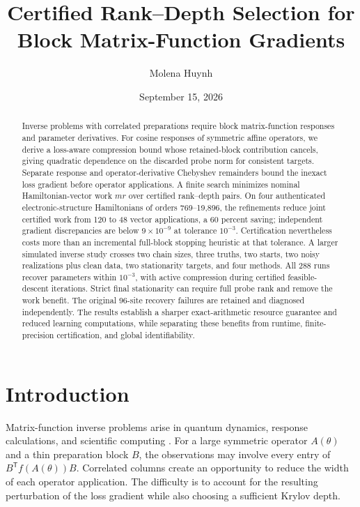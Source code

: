 \documentclass[10pt,letterpaper,twoside]{article}
\begin{document}
\title{Certified Rank--Depth Selection for Block Matrix-Function Gradients}
\author{Molena Huynh}
\date{September 15, 2026}
\maketitle
\begin{abstract}
Inverse problems with correlated preparations require block matrix-function
responses and parameter derivatives. For cosine responses of symmetric affine
operators, we derive a loss-aware compression bound whose retained-block
contribution cancels, giving quadratic dependence on the discarded probe norm
for consistent targets. Separate response and operator-derivative Chebyshev
remainders bound the inexact loss gradient before operator applications. A
finite search minimizes nominal Hamiltonian-vector work $mr$ over certified
rank--depth pairs. On four authenticated electronic-structure Hamiltonians of
orders 769--19,896, the refinements reduce joint certified work from 120 to 48
vector applications, a 60 percent saving; independent gradient discrepancies
are below $9\times10^{-9}$ at tolerance $10^{-3}$. Certification nevertheless
costs more than an incremental full-block stopping heuristic at that tolerance.
A larger simulated inverse study crosses two chain sizes, three truths, two
starts, two noisy realizations plus clean data, two stationarity targets, and
four methods. All 288 runs recover parameters within $10^{-3}$, with active
compression during certified feasible-descent iterations. Strict final
stationarity can require full probe rank and remove the work benefit. The
original 96-site recovery failures are retained and diagnosed independently.
The results establish a sharper exact-arithmetic resource guarantee and
reduced learning computations, while separating these benefits from runtime,
finite-precision certification, and global identifiability.
\end{abstract}

\section{Introduction}
Matrix-function inverse problems arise in quantum dynamics, response calculations,
and scientific computing \cite{higham2008,saad1992,hochbruck1997}. For a large
symmetric operator $A(\theta)$ and a thin preparation block $B$, the observations
may involve every entry of $B^{\mathsf T}f(A(\theta))B$. Correlated columns create
an opportunity to reduce the width of each operator application. The difficulty
is to account for the resulting perturbation of the loss gradient while also
choosing a sufficient Krylov depth.
\end{document}
